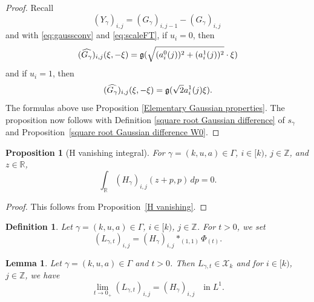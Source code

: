 \documentclass[12pt,reqno]{amsart}
\theoremstyle{plain}
\newtheorem{lemma}[theorem]{Lemma}
\newtheorem{proposition}[theorem]{Proposition}
\newtheorem{definition}[theorem]{Definition}
\numberwithin{equation}{section}
\theoremstyle{remark}
\newcommand{\uses}[1]{}
\newcommand{\usesdefs}[1]{}
\newcommand{\Z}{{\mathbb Z}}
\newcommand{\R}{{\mathbb R}}
\begin{document}
\begin{proof}
Recall
\[ (Y_\gamma)_{i,j} = (G_\gamma)_{i,j-1} - (G_\gamma)_{i,j}\ \]
and with \eqref{eq:gaussconv} and \eqref{eq:scaleFT}, if $u_i=0$, then
\[ (\widehat{G_\gamma})_{i,j}(\xi, -\xi) = \mathfrak{g}(\sqrt{(a_{i}^0(j))^2 + (a_{i}^1(j))^2}\cdot \xi) \]
and if $u_i=1$, then
\[ (\widehat{G_\gamma})_{i,j}(\xi, -\xi) = \mathfrak{g}(\sqrt{2} a_{i}^1(j) \xi).\]
The formulas above use Proposition \ref{Elementary Gaussian properties}. The proposition now follows with Definition \ref{square root Gaussian difference} of $s_\gamma$ and Proposition~\ref{square root Gaussian difference W0}.
\end{proof}


\begin{proposition}[H vanishing integral]\label{H vanishing integral}\uses{H vanishing}\usesdefs{geometric parameters,H multiplier}
    For $\gamma=(k,u,a)\in \Gamma$, $i\in [k)$, $j\in \Z$, and $z\in \R$,
\begin{equation}\label{auto:H-kernel-diagonal-cancellation-integral}
   \int_{\R} (H_{\gamma})_{i,j}(z+p,p)\,dp=0.
\end{equation}
\end{proposition}

\begin{proof}
This follows from Proposition~\ref{H vanishing}.
\end{proof}


\begin{definition}\label{auto:L-kernel-definition}\uses{}\usesdefs{auto:convolution-along-vector-definition,standard bump,geometric parameters,H multiplier}
Let $\gamma=(k,u,a)\in \Gamma$, $i\in [k)$, $j\in \Z$. For $t>0$, we set
\begin{equation}\label{auto:L-kernel-convolution}
(L_{\gamma,t})_{i,j} =(H_{\gamma})_{i,j} \ast_{(1,1)} \Phi_{(t)}.
\end{equation}
\end{definition}

\begin{lemma}\label{L:F_t}\uses{P:schwartz-into-wiener,convolution vector,H-in-X}\usesdefs{standard bump,geometric parameters,double sequence of 2D functions,H multiplier,auto:L-kernel-definition}
Let $\gamma=(k,u,a)\in \Gamma$ and $t>0$. Then $L_{\gamma,t} \in \mathcal{X}_k$ and for $i\in [k)$, $j\in \Z$, we have
\begin{equation}\label{auto:L-kernel-small-scale-limit}
\lim_{t\to 0_+} (L_{\gamma,t})_{i,j} = (H_{\gamma})_{i,j} \quad\text{in}\;L^1.
\end{equation}
\end{lemma}
\end{document}
